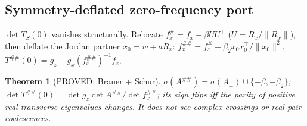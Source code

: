 \documentclass[10pt,a4paper]{article}
\newtheorem{theorem}{Theorem}
\theoremstyle{definition}
\newcommand{\Aperp}{A_\perp}
\newcommand{\status}[1]{\textsf{\small #1}}
\begin{document}
\subsection{Symmetry-deflated zero-frequency port}
$\det T_S(0)$ vanishes structurally. Relocate $f_x^\#=f_x-\beta UU^\top$ ($U=R_x/\|R_x\|$), then deflate the
Jordan partner $x_0=w+aR_x$: $f_x^{\#\#}=f_x^\#-\beta_2x_0x_0^\top/\|x_0\|^2$, $T^{\#\#}(0)=g_z-g_x(f_x^{\#\#})^{-1}f_z$.
\begin{theorem}[\status{PROVED}; Brauer + Schur]
$\sigma(A^{\#\#})=\sigma(\Aperp)\cup\{-\beta,-\beta_2\}$; $\det T^{\#\#}(0)=\det g_z\det A^{\#\#}/\det f_x^{\#\#}$;
its sign flips iff the parity of positive real transverse eigenvalues changes. It does not see complex
crossings or real-pair coalescences.
\end{theorem}
\end{document}
